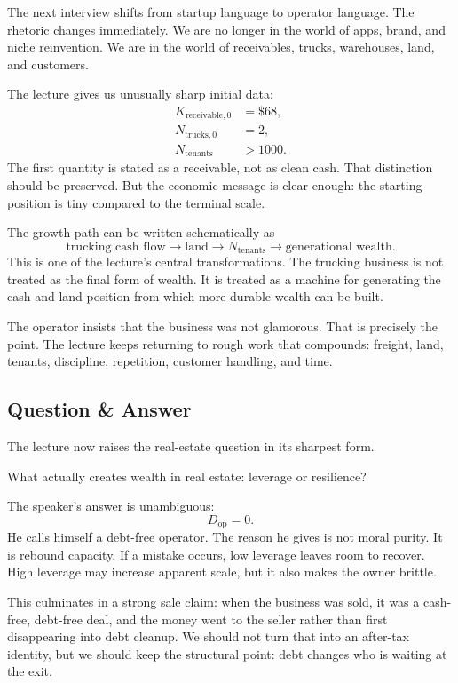 The next interview shifts from startup language to operator language. The rhetoric changes immediately. We are no longer in the world of apps, brand, and niche reinvention. We are in the world of receivables, trucks, warehouses, land, and customers.

The lecture gives us unusually sharp initial data:
\begin{align}
K_{\text{receivable},0}&=\$68,\\
N_{\text{trucks},0}&=2,\\
N_{\text{tenants}}&>1000.
\end{align}
The first quantity is stated as a receivable, not as clean cash. That distinction should be preserved. But the economic message is clear enough: the starting position is tiny compared to the terminal scale.

The growth path can be written schematically as
\begin{equation}
\text{trucking cash flow}\to \text{land}\to N_{\text{tenants}}\to \text{generational wealth}.
\end{equation}
This is one of the lecture's central transformations. The trucking business is not treated as the final form of wealth. It is treated as a machine for generating the cash and land position from which more durable wealth can be built.

The operator insists that the business was not glamorous. That is precisely the point. The lecture keeps returning to rough work that compounds: freight, land, tenants, discipline, repetition, customer handling, and time.

\subsection{Question \& Answer}

The lecture now raises the real-estate question in its sharpest form.

What actually creates wealth in real estate: leverage or resilience?

The speaker's answer is unambiguous:
\begin{equation}
D_{\text{op}}=0.
\end{equation}
He calls himself a debt-free operator. The reason he gives is not moral purity. It is rebound capacity. If a mistake occurs, low leverage leaves room to recover. High leverage may increase apparent scale, but it also makes the owner brittle.

This culminates in a strong sale claim: when the business was sold, it was a cash-free, debt-free deal, and the money went to the seller rather than first disappearing into debt cleanup. We should not turn that into an after-tax identity, but we should keep the structural point: debt changes who is waiting at the exit.

